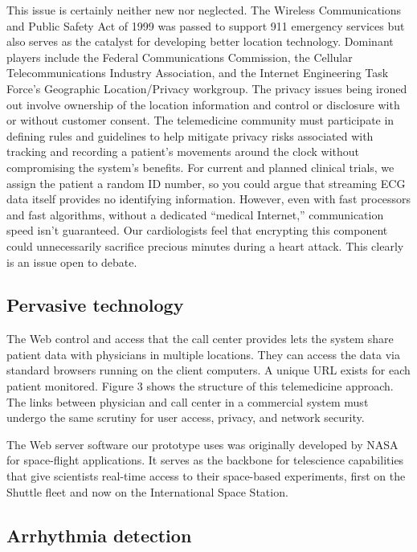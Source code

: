 \documentclass[a4paper,12pt]{article}
\begin{document}
This issue is certainly neither new nor neglected. The Wireless Communications and Public Safety Act of 1999 was passed to support 911 emergency services but also serves as the catalyst for developing better location technology. Dominant players include the Federal Communications Commission, the Cellular Telecommunications Industry Association, and the Internet Engineering Task Force’s Geographic Location/Privacy workgroup. The privacy issues being ironed out involve ownership of the location information and control or disclosure with or without customer consent. The telemedicine community must participate in defining rules and guidelines to help mitigate privacy risks associated with tracking and recording a patient’s movements around the clock without compromising the system’s benefits. For current and planned clinical trials, we assign the patient a random ID number, so you could argue that streaming ECG data itself provides no identifying information. However, even with fast processors and fast algorithms, without a dedicated “medical Internet,” communication speed isn’t guaranteed. Our cardiologists feel that encrypting this component could unnecessarily sacrifice precious minutes during a heart attack. This clearly is an issue open to debate.

\subsection{Pervasive technology}


The Web control and access that the call center provides lets the system share patient data with physicians in multiple locations. They can access the data via standard browsers running on the client computers. A unique URL exists for each patient monitored. Figure 3 shows the structure of this telemedicine approach. The links between physician and call center in a commercial system must undergo the same scrutiny for user access, privacy, and network security.

The Web server software our prototype uses was originally developed by NASA for space-flight applications. It serves as the backbone for telescience capabilities that give scientists real-time access to their space-based experiments, first on the Shuttle fleet and now on the International Space Station.

\subsection{Arrhythmia detection}
\end{document}
